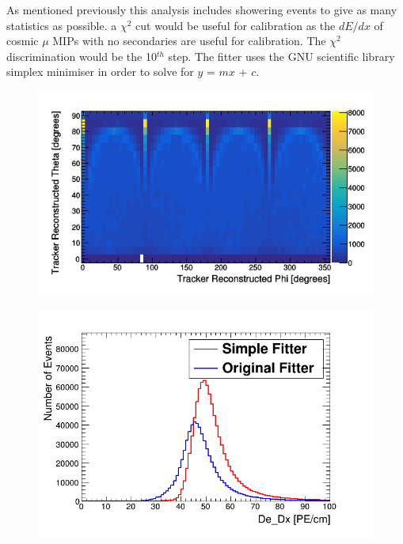 As mentioned previously this analysis includes showering events to give as many statistics as possible. a $\chi^2$ cut would be useful for calibration as the $dE/dx$ of cosmic $\mu$ MIPs with no secondaries are useful for calibration. The $\chi^2$ discrimination would be the 10$^{th}$ step. The fitter uses the GNU scientific library simplex minimiser \cite{galassi2002gnu} in order to solve for $y$ = $mx$ + $c$.  

\begin{figure}[htbp]
 \centering
 \includegraphics[width=0.8\linewidth]{Chapter5/Figs/Raster/pvsTFiduicalHemisphere.png}
 \label{fig:simulatedHemisphereDist}
\end{figure}

\begin{figure}[htbp]
 \centering
 \includegraphics[width=0.8\linewidth]{Chapter5/Figs/Raster/dedxComarison.png}
 \label{fig:dedxGenVsRecoHem}
\end{figure}

